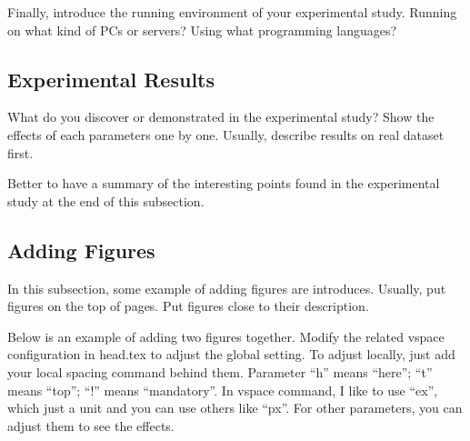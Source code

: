 Finally, introduce the running environment of your experimental study. Running on what kind of PCs or servers? Using what programming languages?

\subsection{Experimental Results}

What do you discover or demonstrated in the experimental study? Show the effects of each parameters one by one. Usually, describe results on real dataset first.

Better to have a summary of the interesting points found in the experimental study at the end of this subsection.

\subsection{Adding Figures}
In this subsection, some example of adding figures are introduces. Usually, put figures on the top of pages. Put figures close to their description. 

Below is an example of adding two figures together. Modify the related vspace configuration in head.tex to adjust the global setting. To adjust locally, just add your local spacing command behind them. Parameter ``h'' means ``here''; ``t'' means ``top''; ``!'' means ``mandatory''. In vspace command, I like to use ``ex'', which just a unit and you can use others like ``px''. For other parameters, you can adjust them to see the effects.

